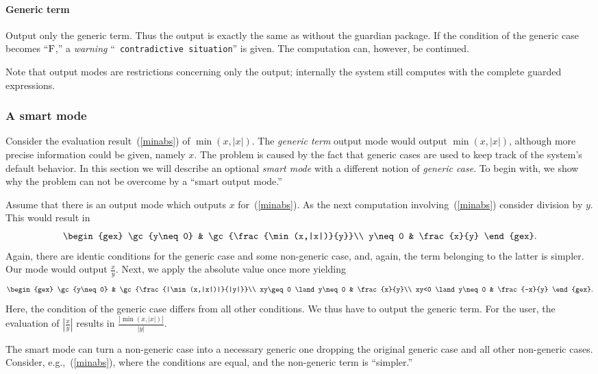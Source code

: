 \paragraph{Generic term} Output only the generic term. Thus the output
is exactly the same as without the guardian package. If the condition
of the generic case becomes ``$\textrm{F}$,'' a {\em warning} ``{\tt
contradictive situation}'' is given. The computation can, however, be
continued.\bigskip

Note that output modes are restrictions concerning only the output;
internally the system still computes with the complete guarded
expressions.
%
\subsubsection{A smart mode}\label{smartmode}
Consider the evaluation result~(\ref{minabs}) of $\min(x,|x|)$. The
{\em generic term} output mode would output $\min(x,|x|)$, although
more precise information could be given, namely $x$. The problem is
caused by the fact that generic cases are used to keep track of the
system's default behavior. In this section we will describe an
optional {\em smart mode} with a different notion of {\em generic
case}. To begin with, we show why the problem can not be overcome by a
``smart output mode.''

Assume that there is an output mode which outputs $x$
for~(\ref{minabs}). As the next computation involving~(\ref{minabs})
consider division by $y$. This would result in
\[
\begin{gex}
\gc{y\neq0} & \gc{\frac{\min(x,|x|)}{y}}\\
y\neq0 & \frac{x}{y}
\end{gex}.
\]
Again, there are identic conditions for the generic case and some
non-generic case, and, again, the term belonging to the latter is
simpler. Our mode would output $\frac{x}{y}$. Next, we apply the
absolute value once more yielding
\[
\begin{gex}
\gc{y\neq 0} & \gc{\frac{|\min(x,|x|)|}{|y|}}\\
xy\geq0 \land y\neq0 & \frac{x}{y}\\
xy<0 \land y\neq0 & \frac{-x}{y}
\end{gex}.
\]
Here, the condition of the generic case differs from all other
conditions. We thus have to output the generic term. For the user, the
evaluation of $|\frac{x}{y}|$ results in $\frac{|\min(x,|x|)|}{|y|}$.

The smart mode can turn a non-generic case into a necessary generic
one dropping the original generic case and all other non-generic
cases. Consider, e.g.,~(\ref{minabs}), where the conditions are equal,
and the non-generic term is ``simpler.''

